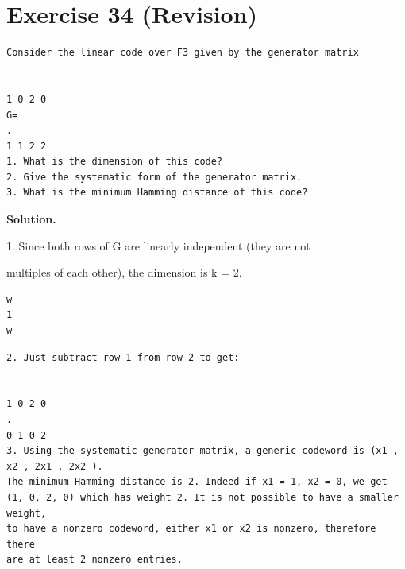 \documentclass[11pt]{article}
\begin{document}
\section*{Exercise 34 (Revision)}
\begin{exercisebox}
\begin{Verbatim}[fontsize=\small]
Consider the linear code over F3 given by the generator matrix


1 0 2 0
G=
.
1 1 2 2
1. What is the dimension of this code?
2. Give the systematic form of the generator matrix.
3. What is the minimum Hamming distance of this code?
\end{Verbatim}
\end{exercisebox}
\begin{solutionbox}
\textbf{Solution.}

1. Since both rows of G are linearly independent (they are not

multiples of each other), the dimension is k = 2.

\begin{Verbatim}[fontsize=\small]
w
1
w
\end{Verbatim}
\begin{Verbatim}[fontsize=\small]
2. Just subtract row 1 from row 2 to get:


1 0 2 0
.
0 1 0 2
3. Using the systematic generator matrix, a generic codeword is (x1 , x2 , 2x1 , 2x2 ).
The minimum Hamming distance is 2. Indeed if x1 = 1, x2 = 0, we get
(1, 0, 2, 0) which has weight 2. It is not possible to have a smaller weight,
to have a nonzero codeword, either x1 or x2 is nonzero, therefore there
are at least 2 nonzero entries.
\end{Verbatim}
\end{solutionbox}
\end{document}

